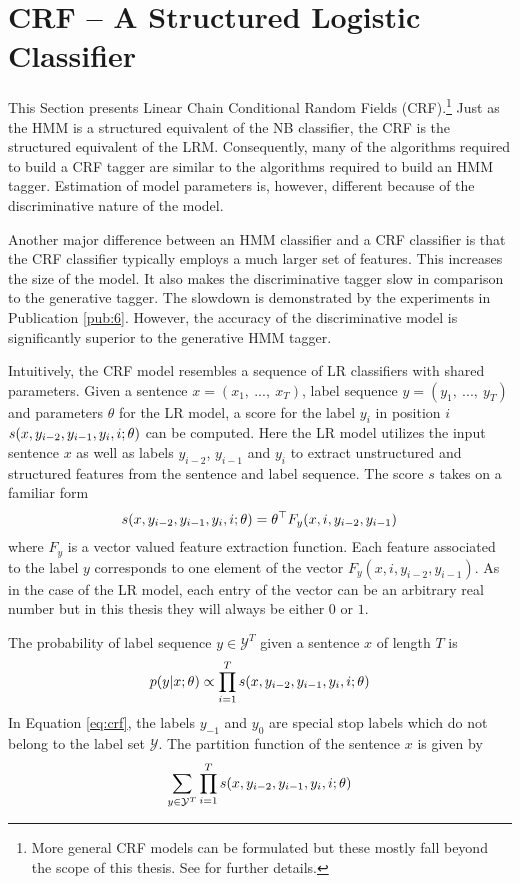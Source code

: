 \section{CRF -- A Structured Logistic Classifier}

This Section presents Linear Chain Conditional Random Fields
(CRF).\footnote{More general CRF models can be formulated but these
  mostly fall beyond the scope of this thesis. See \citep{Sutton2012}
  for further details.} Just as the HMM is a structured equivalent of
the NB classifier, the CRF is the structured equivalent of the
LRM. Consequently, many of the algorithms required to build a CRF
tagger are similar to the algorithms required to build an HMM
tagger. Estimation of model parameters is, however, different because
of the discriminative nature of the model.

Another major difference between an HMM classifier and a CRF
classifier is that the CRF classifier typically employs a much larger
set of features. This increases the size of the model. It also makes
the discriminative tagger slow in comparison to the generative
tagger. The slowdown is demonstrated by the experiments in
Publication \ref{pub:6}. However, the accuracy of the discriminative
model is significantly superior to the generative HMM tagger.

Intuitively, the CRF model resembles a sequence of LR classifiers
with shared parameters. Given a sentence $x = (x_1,\ ...,\ x_T)$,
label sequence $y = (y_1,\ ...,\ y_T)$ and parameters $\theta$ for the
LR model, a score for the label $y_i$ in position $i$ $s(x, y_{i-2},
y_{i-1}, y_i, i\mbox{$ ; \, $} \theta)$ can be computed. Here the LR model
utilizes the input sentence $x$ as well as labels $y_{i - 2}$, $y_{i-1}$ and
$y_i$ to extract unstructured and structured features from the
sentence and label sequence. The score $s$ takes on a familiar form
$$s(x, y_{i-2}, y_{i-1}, y_i, i\mbox{$ ; \, $} \theta) = \theta^\top F_y(x, i, y_{i-2}, y_{i-1})$$
where $F_y$ is a vector valued feature extraction function. Each
feature associated to the label $y$ corresponds to one element of the
vector $F_y(x, i, y_{i-2}, y_{i-1})$. As in the case of the LR model,
each entry of the vector can be an arbitrary real number but in this
thesis they will always be either $0$ or $1$.

The probability of label sequence $y \in \mathcal{Y}^T$ given a sentence $x$ of length $T$ is
\begin{equation}\label{eq:crf}p(y|x\mbox{$ ; \, $}\theta) \propto \prod_{i = 1}^T s(x, y_{i-2}, y_{i-1}, y_i, i\mbox{$ ; \, $} \theta)\end{equation}
In Equation \ref{eq:crf}, the labels $y_{-1}$ and $y_0$ are special
stop labels which do not belong to the label set $\mathcal{Y}$. The partition function of the sentence $x$ is given by
\begin{equation}\sum_{y\in \mathcal{Y}^T}\prod_{i = 1}^T s(x, y_{i-2}, y_{i-1}, y_i, i\mbox{$ ; \, $} \theta)\end{equation}

